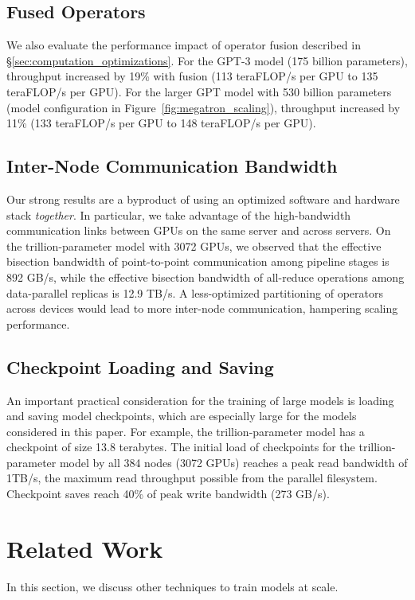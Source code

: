 \documentclass[sigconf,nonacm]{acmart}
\begin{document}
\subsection{Fused Operators}
We also evaluate the performance impact of operator fusion described in \S\ref{sec:computation_optimizations}. For the GPT-3 model (175 billion parameters), throughput increased by 19\% with fusion (113 teraFLOP/s per GPU to 135 teraFLOP/s per GPU). For the larger GPT model with 530 billion parameters (model configuration in Figure~\ref{fig:megatron_scaling}), throughput increased by 11\% (133 teraFLOP/s per GPU to 148 teraFLOP/s per GPU).

\subsection{Inter-Node Communication Bandwidth}
Our strong results are a byproduct of using an optimized software and hardware stack \emph{together}. In particular, we take advantage of the high-bandwidth communication links between GPUs on the same server and across servers. On the trillion-parameter model with 3072 GPUs, we observed that the effective bisection bandwidth of point-to-point communication among pipeline stages is 892 GB/s, while the effective bisection bandwidth of all-reduce operations among data-parallel replicas is 12.9 TB/s. A less-optimized partitioning of operators across devices would lead to more inter-node communication, hampering scaling performance.

\subsection{Checkpoint Loading and Saving}

An important practical consideration for the training of large models is loading and saving model checkpoints, which are especially large for the models considered in this paper. For example, the trillion-parameter model has a checkpoint of size 13.8 terabytes. The initial load of checkpoints for the trillion-parameter model by all 384 nodes (3072 GPUs) reaches a peak read bandwidth of 1TB/s, the maximum read throughput possible from the parallel filesystem. Checkpoint saves reach 40\% of peak write bandwidth (273 GB/s).
\section{Related Work}

In this section, we discuss other techniques to train models at scale.
\end{document}

